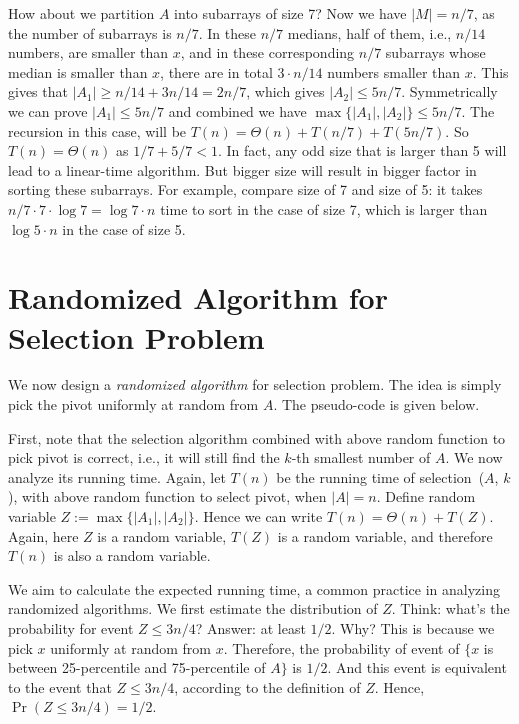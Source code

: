 How about we partition $A$ into subarrays of size 7?
Now we have $|M| = n/7$, as the number of subarrays is $n/7$.
In these $n/7$ medians, half of them, i.e., $n/14$ numbers, are smaller than $x$,
and in these corresponding $n/7$ subarrays whose median is smaller than $x$, there are in total $3\cdot n/14$ numbers smaller than $x$.
This gives that $|A_1| \ge n/14 + 3n/14 = 2n/7$, which gives $|A_2| \le 5n/7$. Symmetrically we can prove $|A_1| \le 5n/7$ and combined we have 
$\max\{|A_1|, |A_2|\} \le 5n/7$.
The recursion in this case, will be $T(n) = \Theta(n) + T(n/7) + T(5n/7)$.
So $T(n) = \Theta(n)$ as $1/7 + 5/7 < 1$. 
In fact, any odd size that is larger than 5 will lead to a linear-time algorithm.
But bigger size will result in bigger factor in sorting these subarrays. 
For example, compare size of 7 and size of 5: it takes $n/7 \cdot 7 \cdot \log 7 = \log 7 \cdot n$ time to sort in the case of size 7,
which is larger than $\log 5 \cdot n$ in the case of size 5.

\section*{Randomized Algorithm for Selection Problem}

We now design a \emph{randomized algorithm} for selection problem.
The idea is simply pick the pivot uniformly at random from $A$.
The pseudo-code is given below.

\begin{minipage}{0.8\textwidth}
	\xxx
	\xxx
	\xxx
\end{minipage}

First, note that the selection algorithm combined with above random function to pick pivot is correct, i.e., it will still find the
$k$-th smallest number of $A$.
We now analyze its running time. 
Again, let $T(n)$ be the running time of selection~($A$, $k$), with above random function to select pivot, when $|A| = n$. 
Define random variable $Z := \max\{|A_1|, |A_2|\}$.
Hence we can write $T(n) = \Theta(n) + T(Z)$.
Again, here $Z$ is a random variable, $T(Z)$ is a random variable, and therefore $T(n)$ is also a random variable.

We aim to calculate the expected running time, a common practice in analyzing randomized algorithms.
We first estimate the distribution of $Z$.
Think: what's the probability for event $Z \le 3n/4$?
Answer: at least $1/2$. Why? This is because we pick $x$ uniformly at random from $x$.
Therefore, the probability of event of $\{x$ is between 25-percentile and 75-percentile of $A\}$ is $1/2$.
And this event is equivalent to the event that $Z \le 3n/4$, according to the definition of $Z$.
Hence, $\Pr(Z \le 3n/4) = 1/2$.

